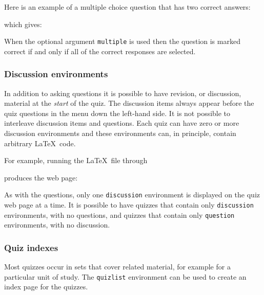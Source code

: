 \documentclass[svgnames]{article}
\begin{document}

Here is an example of a multiple choice question that has
two correct answers:

  
  \label{choice-multiple}

\noindent which gives:


When the optional argument \Verb|multiple| is used then the question is
marked correct if and only if all of the correct responses are selected.

  \subsubsection{Discussion environments}

In addition to asking questions it is possible to have revision, or
discussion, material at the \textit{start} of the quiz.  The discussion
items always appear before the quiz questions in the menu down the
left-hand side. It is not possible to interleave discussion items and
questions. Each quiz can have zero or more discussion environments and
these environments can, in principle, contain arbitrary \LaTeX\ code.

For example, running the \LaTeX\ file through \WebQuiz

  

produces the web page:


As with the questions, only one \Verb|discussion| environment is
displayed on the quiz web page at a time. It is possible to have quizzes
that contain only \Verb|discussion| environments, with no questions, and
quizzes that contain only \Verb|question| environments, with no
discussion.

  \subsubsection{Quiz indexes}


  Most quizzes occur in sets that cover related material, for example
  for a particular unit of study. The \Verb|quizlist| environment can be
  used to create an index page for the quizzes.
\end{document}
